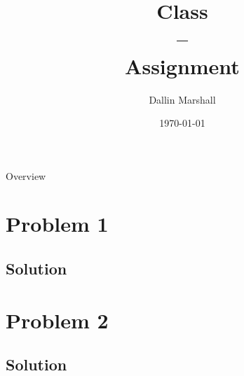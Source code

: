 \documentclass[11pt]{article}
\begin{document}
\title{Class \\ --\\ Assignment }
\author{Dallin Marshall}
\date{\today}
\maketitle
\noindent\makebox[\linewidth]{\rule{\textwidth}{1pt}}

% 

\vspace{4mm}

Overview

\section*{Problem 1}

\subsection*{Solution}


\section*{Problem 2}

\subsection*{Solution}
\end{document}
